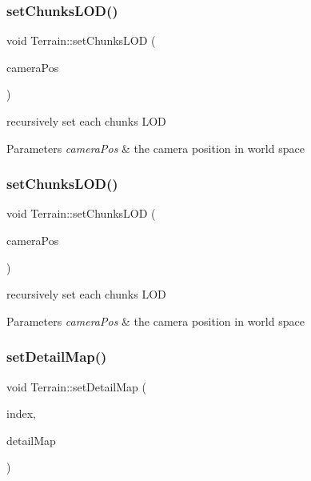\subsubsection{\texorpdfstring{set\+Chunks\+L\+O\+D()}{setChunksLOD()}\hspace{0.1cm}{\footnotesize\ttfamily [1/2]}}
{\footnotesize\ttfamily void Terrain\+::set\+Chunks\+L\+OD (\begin{DoxyParamCaption}\item[{const \hyperlink{classVec3}{Vec3} \&}]{camera\+Pos }\end{DoxyParamCaption})\hspace{0.3cm}{\ttfamily [protected]}}

recursively set each chunk\textquotesingle{}s L\+OD 
\begin{DoxyParams}{Parameters}
{\em camera\+Pos} & the camera position in world space \\
\hline
\end{DoxyParams}
\mbox{\label{classTerrain_ab2a8b176050b693a801f5a73f1d3b6e0}} 
\subsubsection{\texorpdfstring{set\+Chunks\+L\+O\+D()}{setChunksLOD()}\hspace{0.1cm}{\footnotesize\ttfamily [2/2]}}
{\footnotesize\ttfamily void Terrain\+::set\+Chunks\+L\+OD (\begin{DoxyParamCaption}\item[{const \hyperlink{classVec3}{Vec3} \&}]{camera\+Pos }\end{DoxyParamCaption})\hspace{0.3cm}{\ttfamily [protected]}}

recursively set each chunk\textquotesingle{}s L\+OD 
\begin{DoxyParams}{Parameters}
{\em camera\+Pos} & the camera position in world space \\
\hline
\end{DoxyParams}
\mbox{\label{classTerrain_a13ab12df5850aab66f6f45e396c4f169}} 
\subsubsection{\texorpdfstring{set\+Detail\+Map()}{setDetailMap()}\hspace{0.1cm}{\footnotesize\ttfamily [1/2]}}
{\footnotesize\ttfamily void Terrain\+::set\+Detail\+Map (\begin{DoxyParamCaption}\item[{unsigned int}]{index,  }\item[{\hyperlink{structTerrain_1_1DetailMap}{Detail\+Map}}]{detail\+Map }\end{DoxyParamCaption})}

